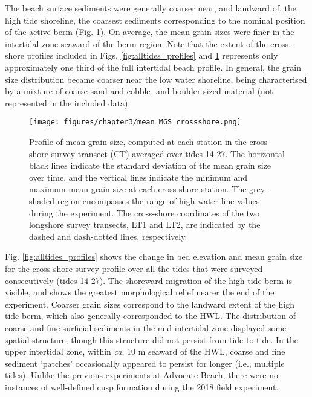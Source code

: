 The beach surface sediments were generally coarser near, and landward of, the high tide shoreline, the coarsest sediments corresponding to the nominal position of the active berm (Fig. \ref{fig:mean_MGS_profile}). On average, the mean grain sizes were finer in the intertidal zone seaward of the berm region. Note that the extent of the cross-shore profiles included in Figs. \ref{fig:alltides_profiles} and \ref{fig:mean_MGS_profile} represents only approximately one third of the full intertidal beach profile. In general, the grain size distribution became coarser near the low water shoreline, being characterised by a mixture of coarse sand and cobble- and boulder-sized material (not represented in the included data). 

\begin{figure}[tbp] %
	\begin{center}
  	\texttt{[image: figures/chapter3/mean\_MGS\_crossshore.png]}
 	\caption[Cross-shore profile of mean grain size]{Profile of mean grain size, computed at each station in the cross-shore survey transect (CT) averaged over tides 14-27. The horizontal black lines indicate the standard deviation of the mean grain size over time, and the vertical lines indicate the minimum and maximum mean grain size at each cross-shore station. The grey-shaded region encompasses the range of high water line values during the experiment. The cross-shore coordinates of the two longshore survey transects, LT1 and LT2, are indicated by the dashed and dash-dotted lines, respectively. \label{fig:mean_MGS_profile}}
 	\end{center}
\end{figure}

Fig. \ref{fig:alltides_profiles} shows the change in bed elevation and mean grain size for the cross-shore survey profile over all the tides that were surveyed consecutively (tides 14-27). The shoreward migration of the high tide berm is visible, and shows the greatest morphological relief nearer the end of the experiment. Coarser grain sizes correspond to the landward extent of the high tide berm, which also generally corresponded to the HWL. The distribution of coarse and fine surficial sediments in the mid-intertidal zone displayed some spatial structure, though this structure did not persist from tide to tide. In the upper intertidal zone, within \textit{ca}. 10 m seaward of the HWL, coarse and fine sediment `patches' occasionally appeared to persist for longer (i.e., multiple tides). Unlike the previous experiments at Advocate Beach, there were no instances of well-defined cusp formation during the 2018 field experiment. 

